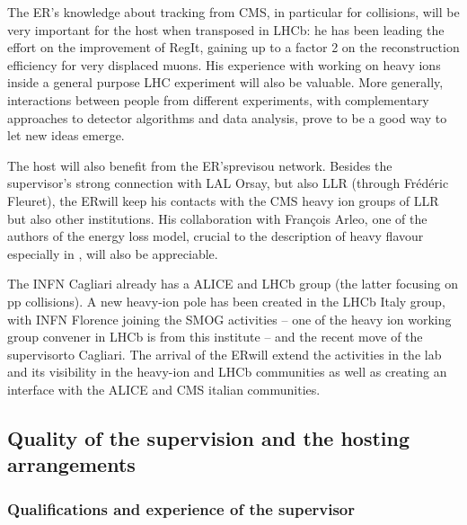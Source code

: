 \documentclass[a4paper,11pt]{article}
\newcommand{\ER}{ER}
\newcommand{\supervisor}{the supervisor}
\begin{document}
The \ER's knowledge about tracking from CMS, in particular for \pbpb collisions, will be very important for the host when transposed in LHCb: he has been leading the effort on the improvement of RegIt, gaining up to a factor 2 on the reconstruction efficiency for very displaced muons. His experience with working on heavy ions inside a general purpose LHC experiment will also be valuable. More generally, interactions between people from different experiments, with complementary approaches to detector algorithms and data analysis, prove to be a good way to let new ideas emerge. 

The host will also benefit from the \ER'sprevisou network. Besides \supervisor's strong connection with LAL Orsay, but also LLR (through Frédéric Fleuret), the \ER will keep his contacts with the CMS heavy ion groups of LLR but also other institutions. His collaboration with François Arleo, one of the authors of the energy loss model, crucial to the description of heavy flavour especially in \ppb, will also be appreciable.

The INFN Cagliari already has a ALICE and LHCb group (the latter
focusing on pp collisions). A new heavy-ion pole has been created in the
LHCb Italy group, with INFN Florence joining the SMOG activities -- one 
of the heavy ion working group convener in LHCb is from this institute --
and the recent move of \supervisor to Cagliari. The arrival of the 
\ER will extend the activities in the lab and its visibility in
the heavy-ion and LHCb communities as well as creating an
interface with the ALICE and CMS italian communities.



%           

\subsection{Quality of the supervision and the hosting arrangements} 
\label{sec:supervision}

\subsubsection{Qualifications and experience of the supervisor}

% 
\end{document}
